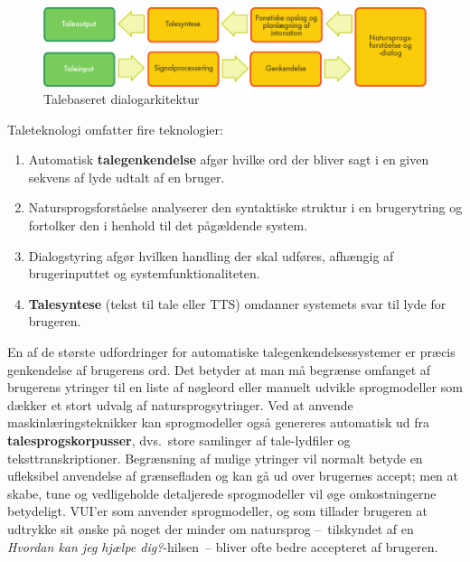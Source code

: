 \begin{multicols}{2}
\begin{figure}[htb]
  \center 
  \includegraphics[width=\textwidth]{../_media/danish/simple_speech-based_dialogue_architecture}
  \caption{Talebaseret dialogarkitektur}
  \label{fig:dialoguearch_de}
\end{figure}

Taleteknologi omfatter fire teknologier:

\begin{enumerate}
  \item Automatisk {\bf talegenkendelse} afg\o r hvilke ord der bliver sagt i en given sekvens af lyde udtalt af en bruger.
      \item Natursprogsforst\aa else analyserer den syntaktiske struktur i en brugerytring og fortolker den i henhold til det p\aa g\ae ldende system.
      \item  Dialogstyring afg\o r hvilken handling der skal udf\o res, afh\ae ngig af brugerinputtet og systemfunktionaliteten.
      \item {\bf Talesyntese} (tekst til tale eller TTS) omdanner sy\-stemets svar til lyde for brugeren.
\end{enumerate}

  En af de st\o rste udfordringer for automatiske talegen\-kendelsessystemer er pr\ae cis genkendelse af brugerens ord. Det betyder at man \mbox{m\aa} begr\ae nse omfanget af brugerens ytringer til en liste af n\o gleord eller manuelt udvikle sprogmodeller som d\ae kker et stort udvalg af natursprogsytringer. Ved at anvende maskinl\ae rings\-teknikker kan sprogmodeller \mbox{ogs\aa} genereres automatisk ud fra {\bf talesprogskorpusser}, dvs.\ store samlinger af tale-lydfiler og teksttranskriptioner. Begr\ae nsning af mulige ytringer vil normalt betyde en ufleksibel anvendelse af gr\ae nsefladen og kan \mbox{g\aa} ud over brugernes accept; men at skabe, tune og vedligeholde detaljerede sprogmodeller vil \o ge omkostningerne betydeligt. VUI'er som anvender sprogmodeller, og som tillader brugeren at udtrykke sit \o nske \mbox{p\aa} noget der minder om natursprog --~tilskyndet af en {\it Hvordan kan jeg hj\ae lpe dig?}-hilsen~-- bliver ofte bedre accepteret af brugeren.


\end{multicols}
